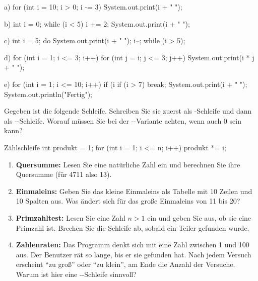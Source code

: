 \begin{tcbraster}[raster columns=2, raster equal height=rows, raster column skip=3mm, raster row skip=1mm]
\begin{javacode}[Ausschnitt]{a)}
for (int i = 10; i > 0; i -= 3) {
	System.out.print(i + " ");
}
\end{javacode}
\begin{javacode}[Ausschnitt]{b)}
int i = 0;
while (i < 5) {
	i += 2;
	System.out.print(i + " ");
}
\end{javacode}
\begin{javacode}[Ausschnitt]{c)}
int i = 5;
do {
	System.out.print(i + " ");
	i--;
} while (i > 5);
\end{javacode}
\begin{javacode}[Ausschnitt]{d)}
for (int i = 1; i <= 3; i++) {
	for (int j = i; j <= 3; j++) {
		System.out.print(i * j + " ");
	}
}
\end{javacode}
\end{tcbraster}
\begin{javacode}[Ausschnitt]{e)}
for (int i = 1; i <= 10; i++) {
	if (i %
	if (i > 7) break;
	System.out.print(i + " ");
}
System.out.println("Fertig");
\end{javacode}

Gegeben ist die folgende Schleife. Schreiben Sie sie zuerst als -Schleife und dann als --Schleife. Worauf müssen Sie bei der --Variante achten, wenn  auch 0 sein kann?
\begin{javacode}[Ausschnitt]{Zählschleife}
int produkt = 1;
for (int i = 1; i <= n; i++) {
	produkt *= i;
}
\end{javacode}

\begin{enumerate}[label=\alph*)]
\item \textbf{Quersumme:} Lesen Sie eine natürliche Zahl ein und berechnen Sie ihre Quersumme (für 4711 also 13).
\item \textbf{Einmaleins:} Geben Sie das kleine Einmaleins als Tabelle mit 10 Zeilen und 10 Spalten aus. Was ändert sich für das große Einmaleins von 11 bis 20?
\item \textbf{Primzahltest:} Lesen Sie eine Zahl $n > 1$ ein und geben Sie aus, ob sie eine Primzahl ist. Brechen Sie die Schleife ab, sobald ein Teiler gefunden wurde.
\item \textbf{Zahlenraten:} Das Programm denkt sich mit  eine Zahl zwischen 1 und 100 aus. Der Benutzer rät so lange, bis er sie gefunden hat. Nach jedem Versuch erscheint \enquote{zu groß} oder \enquote{zu klein}, am Ende die Anzahl der Versuche. Warum ist hier eine --Schleife sinnvoll?
\end{enumerate}

